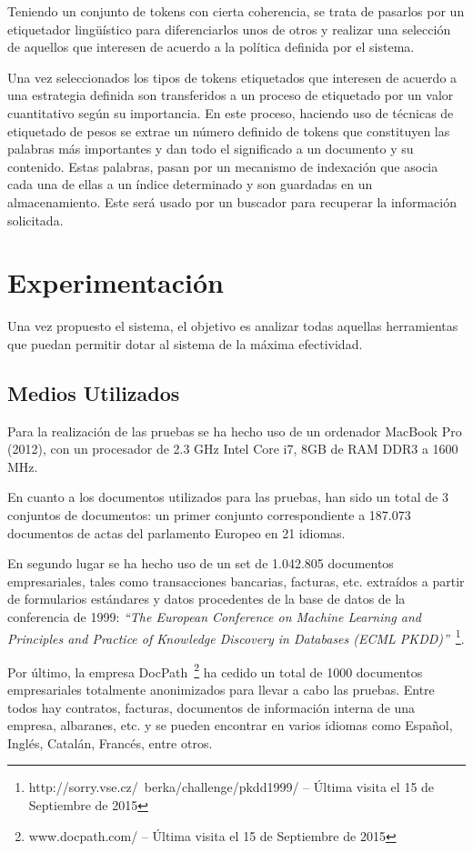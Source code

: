 \documentclass[runningheads,a4paper]{llncs}
\theoremstyle{break}
\begin{document}
Teniendo un conjunto de tokens con cierta coherencia, se trata de pasarlos por un etiquetador lingüístico para diferenciarlos unos de otros y realizar una selección de aquellos que interesen de acuerdo a la política definida por el sistema.

Una vez seleccionados los tipos de tokens etiquetados que interesen de acuerdo a una estrategia definida son transferidos a un proceso de etiquetado por un valor cuantitativo según su importancia. En este proceso, haciendo uso de técnicas de etiquetado de pesos se extrae un número definido de tokens que constituyen las palabras más importantes y dan todo el significado a un documento y su contenido. Estas palabras, pasan por un mecanismo de indexación que asocia cada una de ellas a un índice determinado y son guardadas en un almacenamiento. Este será usado por un buscador para recuperar la información solicitada.

\section{Experimentación}
Una vez propuesto el sistema, el objetivo es analizar todas aquellas herramientas que puedan permitir dotar al sistema de la máxima efectividad.

\subsection{Medios Utilizados}

Para la realización de las pruebas se ha hecho uso de un ordenador MacBook Pro (2012), con un procesador de 2.3 GHz Intel Core i7, 8GB de RAM DDR3 a 1600 MHz. 

En cuanto a los documentos utilizados para las pruebas, han sido un total de 3 conjuntos de documentos: un primer conjunto correspondiente a 187.073 documentos de actas del parlamento Europeo en 21 idiomas. 

En segundo lugar se ha hecho uso de un set de 1.042.805 documentos empresariales, tales como transacciones bancarias, facturas, etc. extraídos a partir de formularios estándares y datos procedentes de la base de datos de la conferencia de 1999: \textit{``The European Conference on Machine Learning and Principles and Practice of Knowledge Discovery in Databases (ECML PKDD)''}~\footnote{http://sorry.vse.cz/~berka/challenge/pkdd1999/ -- Última visita el 15 de Septiembre de 2015}.

Por último, la empresa DocPath~\footnote{www.docpath.com/ -- Última visita el 15 de Septiembre de 2015} ha cedido un total de 1000 documentos empresariales totalmente anonimizados para llevar a cabo las pruebas. Entre todos hay contratos, facturas, documentos de información interna de una empresa, albaranes, etc. y se pueden encontrar en varios idiomas como Español, Inglés, Catalán, Francés, entre otros.
\end{document}
